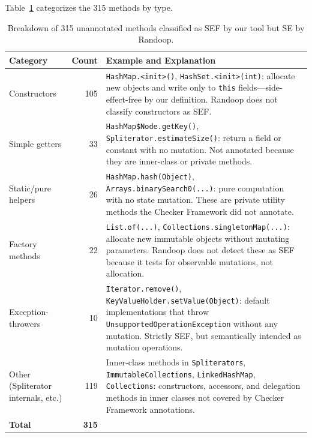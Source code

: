 Table~\ref{tab:unann-breakdown} categorizes the 315 methods by type.

\begin{table}[h]
\centering
\caption{Breakdown of 315 unannotated methods classified as SEF by our tool but SE by Randoop.}
\label{tab:unann-breakdown}
\begin{tabular}{lrp{7.5cm}}
\toprule
\textbf{Category} & \textbf{Count} & \textbf{Example and Explanation} \\
\midrule
Constructors
& 105 & \texttt{HashMap.<init>()}, \texttt{HashSet.<init>(int)}: allocate new objects and write only to \texttt{this} fields---side-effect-free by our definition. Randoop does not classify constructors as SEF. \\

Simple getters
& 33 & \texttt{HashMap\$Node.getKey()}, \texttt{Spliterator.estimateSize()}: return a field or constant with no mutation. Not annotated because they are inner-class or private methods. \\

Static/pure helpers
& 26 & \texttt{HashMap.hash(Object)}, \texttt{Arrays.binarySearch0(...)}: pure computation with no state mutation. These are private utility methods the Checker Framework did not annotate. \\

Factory methods
& 22 & \texttt{List.of(...)}, \texttt{Collections.singletonMap(...)}: allocate new immutable objects without mutating parameters. Randoop does not detect these as SEF because it tests for observable mutations, not allocation. \\

Exception-throwers
& 10 & \texttt{Iterator.remove()}, \texttt{KeyValueHolder.setValue(Object)}: default implementations that throw \texttt{UnsupportedOperationException} without any mutation. Strictly SEF, but semantically intended as mutation operations. \\

Other (Spliterator internals, etc.)
& 119 & Inner-class methods in \texttt{Spliterators}, \texttt{ImmutableCollections}, \texttt{LinkedHashMap}, \texttt{Collections}: constructors, accessors, and delegation methods in inner classes not covered by Checker Framework annotations. \\
\midrule
\textbf{Total} & \textbf{315} & \\
\bottomrule
\end{tabular}
\end{table}

